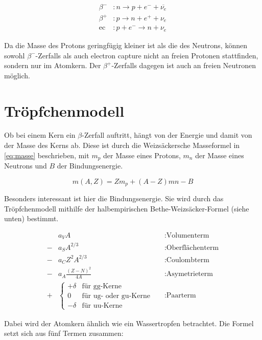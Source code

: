 \begin{align}
	\beta^-&:	 n \rightarrow p + e^- + \overline{\nu_e} \label{eq:beta-} \\
	\beta^+&:	 p \rightarrow n + e^+ + \nu_e \label{eq:beta+} \\
	\text{ec}&: p + e^- \rightarrow n + \nu_e \label{eq:ec}
\end{align}

Da die Masse des Protons geringfügig kleiner ist als die des Neutrons, können sowohl $\beta^-$-Zerfalls als auch electron capture nicht an freien Protonen stattfinden, sondern nur im Atomkern. Der $\beta^+$-Zerfalls dagegen ist auch an freien Neutronen möglich.

\section{Tröpfchenmodell}
Ob bei einem Kern ein $\beta$-Zerfall auftritt, hängt von der Energie und damit von der Masse des Kerns ab. Diese ist durch die Weizsäckersche Masseformel in \cref{eq:masse} beschrieben, mit $m_p$ der Masse eines Protons, $m_n$ der Masse eines Neutrons und $B$ der Bindungsenergie.

\begin{equation}
	m(A,Z) = Zm_p + (A-Z)mn-B
	\label{eq:masse}
\end{equation}

Besonders interessant ist hier die Bindungsenergie. Sie wird durch das Tröpfchenmodell mithilfe der halbempirischen Bethe-Weizsäcker-Formel (siehe unten) bestimmt.

\begin{align*}
	&a_V A  &&:\text{Volumenterm}\\
	-&a_S A^{2/3} &&:\text{Oberflächenterm}\\
	-&a_C Z^2 A^{2/3} &&:\text{Coulombterm}\\
	-&a_A \frac{(Z-N)^2}{4A} &&:\text{Asymetrieterm}\\
	+&\begin{cases}
		+\delta  &\text{für gg-Kerne}\\
		0 &\text{für ug- oder gu-Kerne} \\
		-\delta &\text{für uu-Kerne} 
	\end{cases}&&:\text{Paarterm}
\end{align*}

Dabei wird der Atomkern ähnlich wie ein Wassertropfen betrachtet. Die Formel setzt sich aus fünf Termen zusammen:

